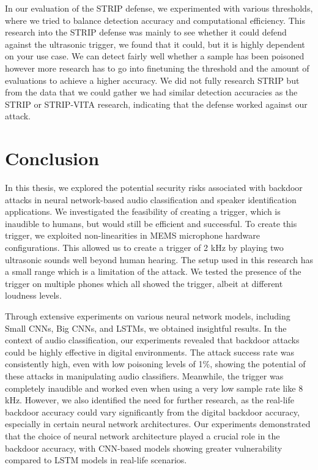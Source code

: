 \documentclass{report}
\theoremstyle{definition}
\theoremstyle{remark}
\begin{document}
\begin{minipage}{\textwidth}
\begin{minipage}{.4\textwidth}
    \label{fig:weakTrigger}
\end{minipage}
\end{minipage}

In our evaluation of the STRIP defense, we experimented with various thresholds, where we tried to balance detection accuracy and computational efficiency. This research into the STRIP defense was mainly to see whether it could defend against the ultrasonic trigger, we found that it could, but it is highly dependent on your use case. We can detect fairly well whether a sample has been poisoned however more research has to go into finetuning the threshold and the amount of evaluations to achieve a higher accuracy. We did not fully research STRIP but from the data that we could gather we had similar detection accuracies as the STRIP \cite{Strip} or STRIP-VITA\cite{StripVita} research, indicating that the defense worked against our attack.

\chapter{Conclusion}
In this thesis, we explored the potential security risks associated with backdoor attacks in neural network-based audio classification and speaker identification applications. We investigated the feasibility of creating a trigger, which is inaudible to humans, but would still be efficient and successful. To create this trigger, we exploited non-linearities in MEMS microphone hardware configurations. This allowed us to create a trigger of 2 kHz by playing two ultrasonic sounds well beyond human hearing. The setup used in this research has a small range which is a limitation of the attack. We tested the presence of the trigger on multiple phones which all showed the trigger, albeit at different loudness levels.

Through extensive experiments on various neural network models, including Small CNNs, Big CNNs, and LSTMs, we obtained insightful results. In the context of audio classification, our experiments revealed that backdoor attacks could be highly effective in digital environments. The attack success rate was consistently high, even with low poisoning levels of 1\%, showing the potential of these attacks in manipulating audio classifiers. Meanwhile, the trigger was completely inaudible and worked even when using a very low sample rate like 8 kHz. However, we also identified the need for further research, as the real-life backdoor accuracy could vary significantly from the digital backdoor accuracy, especially in certain neural network architectures. Our experiments demonstrated that the choice of neural network architecture played a crucial role in the backdoor accuracy, with CNN-based models showing greater vulnerability compared to LSTM models in real-life scenarios. 
\end{document}
